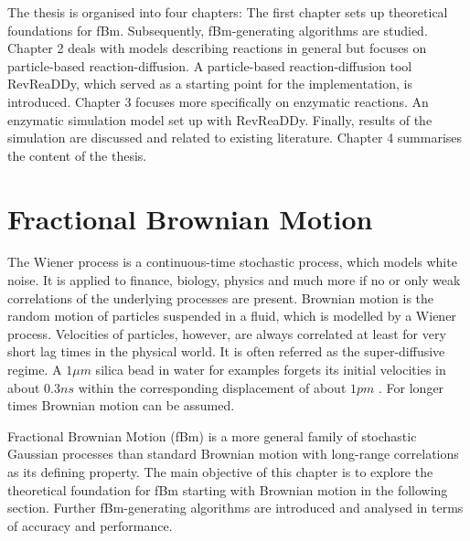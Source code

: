\documentclass[
  a4paper,BCOR10mm,twoside,
  headsepline,footsepline,%
  fleqn,openbib
]{scrbook}
\begin{document}
\par The thesis is organised into four chapters: The first chapter sets up theoretical foundations for fBm. Subsequently, fBm-generating algorithms are studied. Chapter 2 deals with models describing reactions in general but focuses on particle-based reaction-diffusion. A particle-based reaction-diffusion tool RevReaDDy, which served as a starting point for the implementation, is introduced.  Chapter 3 focuses more specifically on enzymatic reactions. An enzymatic simulation model set up with RevReaDDy. Finally, results of the simulation are discussed and related to existing literature. Chapter 4 summarises the content of the thesis. 
\chapter{Fractional Brownian Motion}
The Wiener process is a continuous-time stochastic process, which models white noise. It is applied to finance, biology, physics and much more if no or only weak correlations of the underlying processes are present. Brownian motion is the random motion of particles suspended in a fluid, which is modelled by a Wiener process. Velocities of particles, however, are always correlated at least for very short lag times in the physical world. It is often referred as the super-diffusive regime. A $1 \mu m $  silica bead in water for examples forgets its initial velocities in about $0.3ns$ within the corresponding displacement of about $1pm$ \cite{Huang2011}. For longer times Brownian motion can be assumed.\par
Fractional Brownian Motion (fBm) is a more general family of stochastic Gaussian processes than standard Brownian motion with long-range correlations as its defining property. The main objective of this chapter is to explore the theoretical foundation for fBm starting with Brownian motion in the following section. Further fBm-generating algorithms are introduced and analysed in terms of accuracy and performance.    
\end{document}
